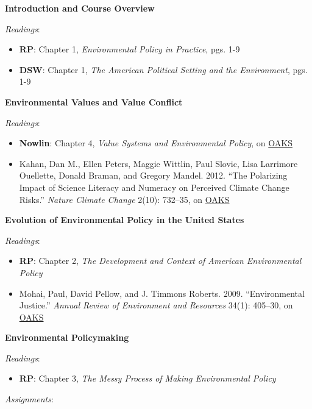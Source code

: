 \week \textbf{Introduction and Course Overview}

\emph{Readings}:

\begin{itemize}
\item
  \textbf{RP}: Chapter 1, \emph{Environmental Policy in Practice}, pgs.
  1-9
\item
  \textbf{DSW}: Chapter 1, \emph{The American Political Setting and the
  Environment}, pgs. 1-9
\end{itemize}

\week \textbf{Environmental Values and Value Conflict}

\emph{Readings}:

\begin{itemize}
\item
  \textbf{Nowlin}: Chapter 4, \emph{Value Systems and Environmental
  Policy}, on \href{https://lms.cofc.edu}{OAKS}
\item
  Kahan, Dan M., Ellen Peters, Maggie Wittlin, Paul Slovic, Lisa
  Larrimore Ouellette, Donald Braman, and Gregory Mandel. 2012. ``The
  Polarizing Impact of Science Literacy and Numeracy on Perceived
  Climate Change Risks.'' \emph{Nature Climate Change} 2(10): 732--35,
  on \href{https://lms.cofc.edu}{OAKS}
\end{itemize}

\week \textbf{Evolution of Environmental Policy in the United States}

\emph{Readings}:

\begin{itemize}
\item
  \textbf{RP}: Chapter 2, \emph{The Development and Context of American
  Environmental Policy}
\item
  Mohai, Paul, David Pellow, and J. Timmons Roberts. 2009.
  ``Environmental Justice.'' \emph{Annual Review of Environment and
  Resources} 34(1): 405--30, on \href{https://lms.cofc.edu}{OAKS}
\end{itemize}

\week \textbf{Environmental Policymaking}

\emph{Readings}:

\begin{itemize}

\item
  \textbf{RP}: Chapter 3, \emph{The Messy Process of Making
  Environmental Policy}
\end{itemize}

\vspace{0.10in} \emph{Assignments}:

